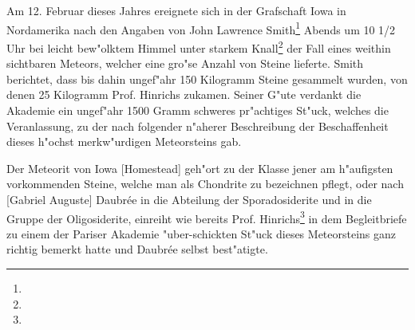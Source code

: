 \documentclass[a4paper, 11pt, oneside]{article}
\begin{document}
\section{}
\subsection*{}
\paragraph{}
Am 12. Februar dieses Jahres ereignete sich in der Grafschaft Iowa in Nordamerika nach den Angaben von John Lawrence Smith\footnote{} Abends um 10 1/2 Uhr bei leicht bew"olktem Himmel unter starkem Knall\footnote{} der Fall eines weithin sichtbaren Meteors, welcher eine gro"se Anzahl von Steine lieferte. Smith berichtet, dass bis dahin ungef"ahr 150 Kilogramm Steine gesammelt wurden, von denen 25 Kilogramm Prof. Hinrichs zukamen. Seiner G"ute verdankt die Akademie ein ungef"ahr 1500 Gramm schweres pr"achtiges St"uck, welches die Veranlassung, zu der nach folgender n"aherer Beschreibung der Beschaffenheit dieses h"ochst merkw"urdigen Meteorsteins gab.

Der Meteorit von Iowa [Homestead] geh"ort zu der Klasse jener am h"aufigsten vorkommenden Steine, welche man als Chondrite zu bezeichnen pflegt, oder nach [Gabriel Auguste] Daubrée in die Abteilung der Sporadosiderite und in die Gruppe der Oligosiderite, einreiht wie bereits Prof. Hinrichs\footnote{} in dem Begleitbriefe zu einem der Pariser Akademie "uber-schickten St"uck dieses Meteorsteins ganz richtig bemerkt hatte und Daubrée selbst best"atigte.
\end{document}
